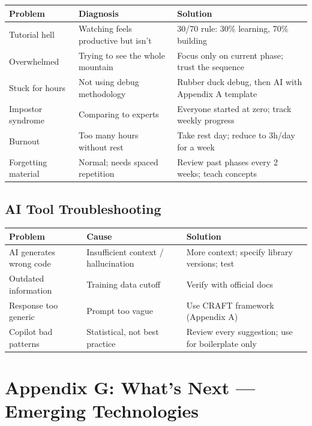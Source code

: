 \documentclass[11pt, a4paper, oneside]{report}
\begin{document}
{{{{{{{{{{{\small
{}
\begin{longtable}{L{0.22\textwidth} L{0.38\textwidth} L{0.30\textwidth}}
\toprule
\textbf{Problem} & \textbf{Diagnosis} & \textbf{Solution} \\
\midrule
\endfirsthead
\bottomrule
\endlastfoot
Tutorial hell & Watching feels productive but isn't & 30/70 rule: 30\% learning, 70\% building \\
Overwhelmed & Trying to see the whole mountain & Focus only on current phase; trust the sequence \\
Stuck for hours & Not using debug methodology & Rubber duck debug, then AI with Appendix A template \\
Impostor syndrome & Comparing to experts & Everyone started at zero; track weekly progress \\
Burnout & Too many hours without rest & Take rest day; reduce to 3h/day for a week \\
Forgetting material & Normal; needs spaced repetition & Review past phases every 2 weeks; teach concepts \\
\end{longtable}

\section[AI Tools]{AI Tool Troubleshooting}

{\small
{}
\begin{longtable}{L{0.22\textwidth} L{0.38\textwidth} L{0.30\textwidth}}
\toprule
\textbf{Problem} & \textbf{Cause} & \textbf{Solution} \\
\midrule
\endfirsthead
\bottomrule
\endlastfoot
AI generates wrong code & Insufficient context / hallucination & More context; specify library versions; test \\
Outdated information & Training data cutoff & Verify with official docs \\
Response too generic & Prompt too vague & Use CRAFT framework (Appendix A) \\
Copilot bad patterns & Statistical, not best practice & Review every suggestion; use for boilerplate only \\
\end{longtable}

\clearpage
\chapter[What's Next]{Appendix G: What's Next --- Emerging Technologies}

}}}}}}}}}}}}
\end{document}
